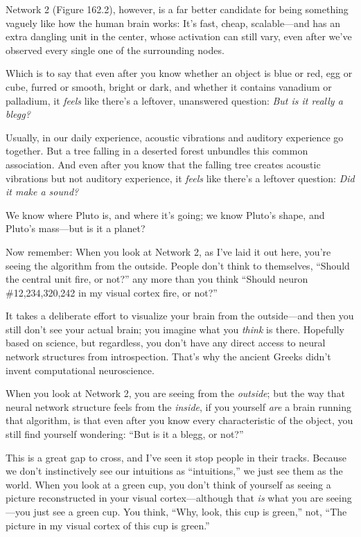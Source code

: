 {
 Network 2 (Figure 162.2), however, is a far better candidate for
being something vaguely like how the human brain works:
It's fast, cheap, scalable---and has an extra dangling
unit in the center, whose activation can still vary, even after
we've observed every single one of the surrounding
nodes.}

{
 Which is to say that even after you know whether an object is blue
or red, egg or cube, furred or smooth, bright or dark, and whether it
contains vanadium or palladium, it \textit{feels} like
there's a leftover, unanswered question: \textit{But is
it really a blegg?}}

{
 Usually, in our daily experience, acoustic vibrations and auditory
experience go together. But a tree falling in a deserted forest
unbundles this common association. And even after you know that the
falling tree creates acoustic vibrations but not auditory experience,
it \textit{feels} like there's a leftover question:
\textit{Did it make a sound?}}

{
 We know where Pluto is, and where it's going; we
know Pluto's shape, and Pluto's
mass---but is it a planet?}

{
 Now remember: When you look at Network 2, as I've
laid it out here, you're seeing the algorithm from the
outside. People don't think to themselves,
``Should the central unit fire, or
not?'' any more than you think
``Should neuron \#12,234,320,242 in my visual cortex
fire, or not?''}

{
 It takes a deliberate effort to visualize your brain from the
outside---and then you still don't see your actual
brain; you imagine what you \textit{think} is there. Hopefully based on
science, but regardless, you don't have any direct
access to neural network structures from introspection.
That's why the ancient Greeks didn't
invent computational neuroscience.}

{
 When you look at Network 2, you are seeing from the
\textit{outside}; but the way that neural network structure feels from
the \textit{inside}, if you yourself \textit{are} a brain running that
algorithm, is that even after you know every characteristic of the
object, you still find yourself wondering: ``But is it
a blegg, or not?''}

{
 This is a great gap to cross, and I've seen it
stop people in their tracks. Because we don't
instinctively see our intuitions as
``intuitions,'' we just see them as
the world. When you look at a green cup, you don't
think of yourself as seeing a picture reconstructed in your visual
cortex---although that \textit{is} what you are seeing---you just see a
green cup. You think, ``Why, look, this cup is
green,'' not, ``The picture in my
visual cortex of this cup is green.''}

